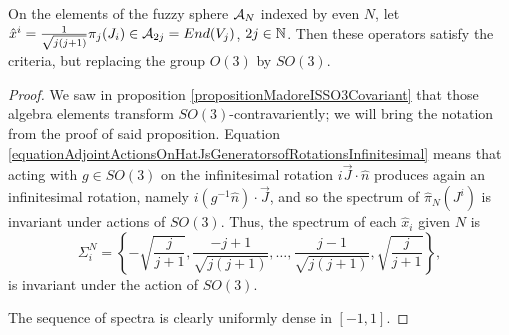     
\begin{proposition}\label{propositionMadoreCoordinatesAreSO3ContravariantCovariant}
On the elements of the fuzzy sphere $\mathcal A_N$ indexed by even $N$, let $\hat x^i = \frac{1}{\sqrt{j(j+1)}}\pi_j(J_i) \in \mathcal A_{2j} = End(V_j)$, $2j \in \mathbb{N}$. Then these operators satisfy the criteria, but replacing the group $O(3)$ by $SO(3)$.
\end{proposition}
\begin{proof}
 We saw in proposition \ref{propositionMadoreISSO3Covariant} that those algebra elements transform $SO(3)$-contravariently; we will bring the notation from the proof of said proposition. %
 Equation \eqref{equationAdjointActionsOnHatJsGeneratorsofRotationsInfinitesimal} means that acting with $g \in SO(3)$ on the infinitesimal rotation $i \vec J \cdot \hat n$ produces again an infinitesimal rotation, namely $i (g^{-1} \hat n)\cdot \vec J$, and so the spectrum of $\hat \pi_N(J^i)$ is invariant under actions of $SO(3)$. Thus, the spectrum of each $\hat x_i$ given $N$ is
 \begin{equation*}
     \Sigma^N_i = \left\{-\sqrt{\frac{j}{j+1}}, \frac{-j+1}{\sqrt{j(j+1)}}, \dots, \frac{j-1}{\sqrt{j(j+1)}},  \sqrt{\frac{j}{j+1}}\right\},
 \end{equation*} is invariant under the action of $SO(3)$. 
 
 The sequence of spectra is clearly uniformly dense in $[-1, 1]$.
 
\end{proof}


